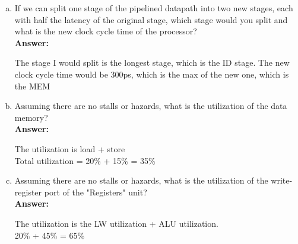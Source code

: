 \documentclass[11pt]{article}
\begin{document}
\begin{enumerate}[(a)]
    \item If we can split one stage of the pipelined datapath into two new stages, each with half the latency of the original stage, which stage would you split and what is the new clock cycle time of the processor?\\
    \textbf{Answer:}
    \begin{center}
    The stage I would split is the longest stage, which is the ID stage. 
    The new clock cycle time would be 300ps, which is the max of the new one, which is the MEM\\
    \end{center}
    

    \item Assuming there are no stalls or hazards, what is the utilization of the data memory?\\
    \textbf{Answer:}
    \begin{center}
        The utilization is load + store\\
        Total utilization  = 20\% + 15\% = 35\%\\
    \end{center}

    \item Assuming there are no stalls or hazards, what is the utilization of the write-register port of the "Registers" unit?\\
    \textbf{Answer:}
    \begin{center}
        The utilization is the LW utilization + ALU utilization.\\
        20\% + 45\% = 65\%\\
    \end{center}
\end{enumerate}
\end{document}
